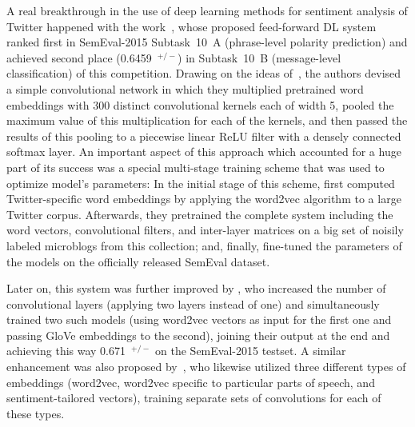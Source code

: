 A real breakthrough in the use of deep learning methods for sentiment
analysis of Twitter happened with the work~\citet{Severyn:15}, whose
proposed feed-forward DL system ranked first in SemEval-2015
Subtask~10~A (phrase-level polarity prediction) \cite{Rosenthal:15}
and achieved second place (0.6459~\F$^{+/-}$) in Subtask~10~B
(message-level classification) of this competition.  Drawing on the
ideas of~\citet{Kalchbrenner:14}, the authors devised a simple
convolutional network in which they multiplied pretrained word
embeddings with 300 distinct convolutional kernels each of width 5,
pooled the maximum value of this multiplication for each of the
kernels, and then passed the results of this pooling to a piecewise
linear ReLU filter with a densely connected softmax layer.  An
important aspect of this approach which accounted for a huge part of
its success was a special multi-stage training scheme that was used to
optimize model's parameters: In the initial stage of this scheme,
\citeauthor{Severyn:15} first computed Twitter-specific word
embeddings by applying the word2vec algorithm to a large Twitter
corpus.  Afterwards, they pretrained the complete system including the
word vectors, convolutional filters, and inter-layer matrices on a big
set of noisily labeled microblogs from this collection; and, finally,
fine-tuned the parameters of the models on the officially released
SemEval dataset.

Later on, this system was further improved by \citet{Deriu:16}, who
increased the number of convolutional layers (applying two layers
instead of one) and simultaneously trained two such models (using
word2vec vectors as input for the first one and passing GloVe
embeddings to the second), joining their output at the end and
achieving this way 0.671~\F$^{+/-}$ on the SemEval-2015 testset.  A
similar enhancement was also proposed by~\citet{Rouvier:16}, who
likewise utilized three different types of embeddings (word2vec,
word2vec specific to particular parts of speech, and
sentiment-tailored vectors), training separate sets of convolutions
for each of these types.



